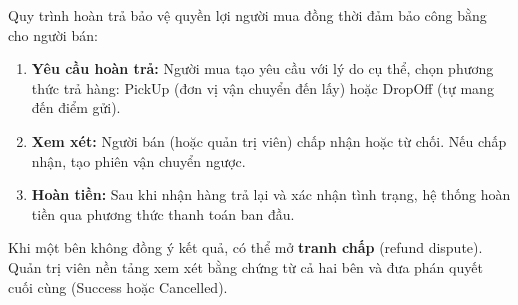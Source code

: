 Quy trình hoàn trả bảo vệ quyền lợi người mua đồng thời đảm bảo công bằng cho người bán:

\begin{enumerate}
    \item \textbf{Yêu cầu hoàn trả:} Người mua tạo yêu cầu với lý do cụ thể, chọn phương thức trả hàng: PickUp (đơn vị vận chuyển đến lấy) hoặc DropOff (tự mang đến điểm gửi).
    \item \textbf{Xem xét:} Người bán (hoặc quản trị viên) chấp nhận hoặc từ chối. Nếu chấp nhận, tạo phiên vận chuyển ngược.
    \item \textbf{Hoàn tiền:} Sau khi nhận hàng trả lại và xác nhận tình trạng, hệ thống hoàn tiền qua phương thức thanh toán ban đầu.
\end{enumerate}

Khi một bên không đồng ý kết quả, có thể mở \textbf{tranh chấp} (refund dispute). Quản trị viên nền tảng xem xét bằng chứng từ cả hai bên và đưa phán quyết cuối cùng (Success hoặc Cancelled).

